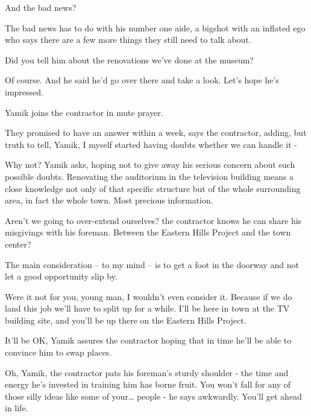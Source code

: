 \documentclass[12pt]{book}
\begin{document}
{\textquotedbl}And the bad news?{\textquotedbl}

{\textquotedbl}The bad news has to do with his number one aide, a bigshot with an inflated ego who says there are a few
more things they still need to talk about.{\textquotedbl}

{\textquotedbl}Did you tell him about the renovations we've done at the museum?{\textquotedbl}

{\textquotedbl}Of course. And he said he'd go over there and take a look. Let's hope he's impressed.{\textquotedbl}

Yamik joins the contractor in mute prayer.

{\textquotedbl}They promised to have an answer within a week,{\textquotedbl} says the contractor{,}
adding, {\textquotedbl}but truth to tell, Yamik, I myself started having doubts whether we can handle it
-{\textquotedbl}

{\textquotedbl}Why not?{\textquotedbl} Yamik asks, hoping not to give away his serious{ }concern about
such possible doubts. Renovating the auditorium in the television building means a close knowledge not only of that
specific structure but of the whole surrounding area, in fact the whole town. Most precious information. ~

{\textquotedbl}Aren't we going to over-extend ourselves?{\textquotedbl} the contractor knows he can share his misgivings
with his foreman. {\textquotedbl}Between the Eastern Hills Project and the town center?{\textquotedbl}

{\textquotedbl}The main consideration -- to my mind -- is to get a foot in the doorway and not let a good opportunity
slip by.{\textquotedbl}

{\textquotedbl}Were it not for you, young man, I wouldn't even consider it. Because if we do land this job we'll have to
split up for a while. I'll be here in town at the TV building site, and you'll be up there on the Eastern Hills
Project.{\textquotedbl}

{\textquotedbl}It'll be OK,{\textquotedbl} Yamik assures the contractor hoping that in time he'll be able to convince
him to swap places. ~

{\textquotedbl}Oh, Yamik,{\textquotedbl} the contractor pats his foreman's sturdy shoulder - the time and energy he's
invested in training him has borne fruit. {\textquotedbl}You won't fall for any of those silly ideas like some of
your{\dots} people -{\textquotedbl} he says awkwardly. {\textquotedbl}You'll get ahead in life.{\textquotedbl}
\end{document}
